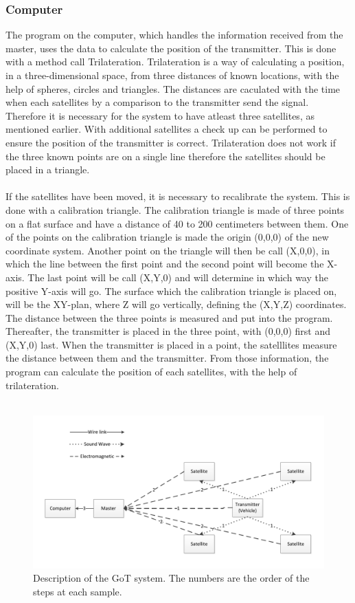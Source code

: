 \subsubsection{Computer}
The program on the computer, which handles the information received from the master, uses the data to calculate the position of the transmitter. This is done with a method call Trilateration. Trilateration is a way of calculating a position, in a three-dimensional space, from three distances of known locations, with the help of spheres, circles and triangles. The distances are caculated with the time when each satellites by a comparison to the transmitter send the signal. Therefore it is necessary for the system to have atleast three satellites, as mentioned earlier.  With additional satellites a check up can be performed to ensure the position of the transmitter is correct. Trilateration does not work if the three known points are on a single line therefore the satellites should be placed in a triangle.\\\\
\noindent
If the satellites have been moved, it is necessary to recalibrate the system. This is done with a calibration triangle. The calibration triangle is made of three points on a flat surface and have a distance of 40 to 200 centimeters between them. One of the points on the calibration triangle is made the origin (0,0,0) of the new coordinate system. Another point on the triangle will then be call (X,0,0), in which the line between the first point and the second point will become the X-axis. The last point will be call (X,Y,0) and will determine in which way the positive Y-axis will go. The surface which the calibration triangle is placed on, will be the XY-plan, where Z will go vertically, defining the (X,Y,Z) coordinates. The distance between the three points is measured and put into the program. Thereafter, the transmitter is placed in the three point, with (0,0,0) first and (X,Y,0) last. When the transmitter is placed in a point, the satelllites measure the distance between them and the transmitter. From those information, the program can calculate the position of each satellites, with the help of trilateration. \\\\

\begin{figure}[H]
	\centering
	\includegraphics[scale=0.7]{figures/GoT-description.pdf}
	\caption{Description of the GoT system. The numbers are the order of the steps at each sample.}
	\label{GoT-description}
\end{figure}
